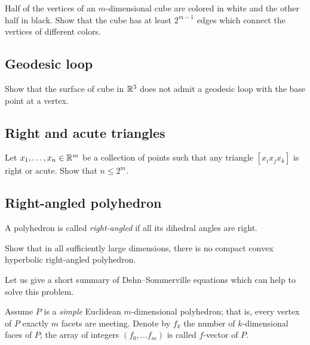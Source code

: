 \begin{pr}
Half of the vertices 
of an $m$-dimensional cube
are colored in white and the other half in black.
Show that the cube has at least $2^{m-1}$ edges which connect the vertices of different colors. 
\end{pr}

\subsection*{Geodesic loop}\label{Geodesic loop}

\begin{pr}
Show that the surface of cube in $\mathbb{R}^3$
does not admit a geodesic loop with the base point at a vertex.
\end{pr}

\subsection*{Right and acute triangles}\label{Right and acute triangles}

\begin{pr}
Let $x_1,\dots,x_n\in\mathbb{R}^m$
be a collection of points such that any triangle $[x_ix_jx_k]$ is right or acute.
Show that $n\le 2^m$.
\end{pr}



\subsection*{Right-angled polyhedron\thm}\label{Right-angled polyhedron}

A polyhedron is called {}\emph{right-angled} if all its dihedral angles are right.

\begin{pr}
Show that in all sufficiently large dimensions, there is no compact convex hyperbolic right-angled polyhedron. 
\end{pr}

Let us give a short summary of Dehn--Sommerville equations 
which can help to solve this problem.

Assume $P$ is a \emph{simple} Euclidean $m$-dimensional polyhedron;
that is, every vertex of $P$ exactly $m$ facets are meeting.
Denote by $f_k$ the number of $k$-dimensional faces of $P$;
the array of integers $(f_0,\dots f_m)$ is called $f$-vector of $P$.

